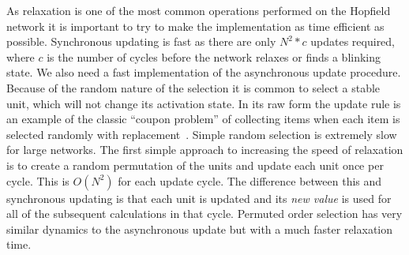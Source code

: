 As relaxation is one of the most common operations performed on the Hopfield network it is important to try to make the implementation as time efficient as possible.  Synchronous updating is fast as there are only $N^2*c$ updates required, where $c$ is the number of cycles before the network relaxes or finds a blinking state. We also need a fast implementation of the asynchronous update procedure.  Because of the random nature of the selection it is common to select a stable unit, which will not change its activation state.  In its raw form the update rule is an example of the classic ``coupon problem'' of collecting items when each item is selected randomly with replacement~\citep{Durrett1996}.  Simple random selection is extremely slow for large networks.  The first simple approach to increasing the speed of relaxation is to create a random permutation of the units and update each unit once per cycle.  This is $O(N^2)$ for each update cycle.  The difference between this and synchronous updating is that each unit is updated and its \emph{new value} is used for all of the subsequent calculations in that cycle.  Permuted order selection has very similar dynamics to the asynchronous update but with a much faster relaxation time.


